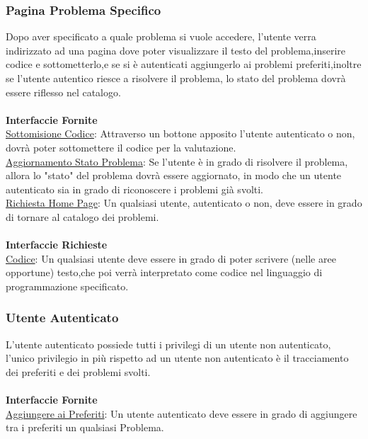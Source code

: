 \documentclass[11pt, a4paper]{article}
\theoremstyle{definition} %
\begin{document}
\subsubsection{Pagina Problema Specifico}
Dopo aver specificato a quale problema si vuole accedere, l'utente verra indirizzato ad una pagina dove poter visualizzare il testo del problema,inserire codice e sottometterlo,e se
si è autenticati aggiungerlo ai problemi preferiti,inoltre se l'utente autentico riesce a risolvere il problema, lo stato del problema dovrà essere riflesso nel catalogo.
\\\\\textbf{Interfaccie Fornite}\\
\underline{Sottomisione Codice}: Attraverso un bottone apposito l'utente autenticato o non, dovrà poter sottomettere il codice per la valutazione.
\\
\underline{Aggiornamento Stato Problema}: Se l'utente è in grado di risolvere il problema, allora lo "stato" del problema dovrà essere aggiornato, in modo che un utente autenticato sia in grado di riconoscere i problemi già svolti.
\\
\underline{Richiesta Home Page}: Un qualsiasi utente, autenticato o non, deve essere in grado di tornare al catalogo dei problemi.
\\\\\textbf{Interfaccie Richieste}
\\\underline{Codice}: Un qualsiasi utente deve essere in grado di poter scrivere (nelle aree opportune) testo,che poi verrà interpretato come codice nel linguaggio di programmazione specificato.
\subsubsection{Utente Autenticato}
L'utente autenticato possiede tutti i privilegi di un utente non autenticato, l'unico privilegio in più rispetto ad un utente non autenticato è il tracciamento dei preferiti e dei problemi svolti.
\\\\\textbf{Interfaccie Fornite}
\\
\underline{Aggiungere ai Preferiti}: Un utente autenticato deve essere in grado di aggiungere tra i preferiti un qualsiasi Problema.
\end{document}
